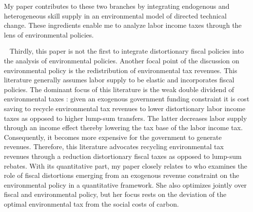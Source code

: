 My paper contributes to these two branches by integrating endogenous and heterogeneous skill supply in an environmental model of directed technical change. These ingredients enable me to analyze labor income taxes through the lens of environmental policies.  




\
Thirdly, this paper is not the first to integrate distortionary fiscal policies into the analysis of environmental policies.
Another focal point of the discussion on environmental policy is the redistribution of environmental tax revenues. This literature generally assumes labor supply to be elastic and incorporates fiscal policies. 
The dominant focus of this literature is the weak double dividend of environmental taxes \citep{Goulder1995EnvironmentalGuide, Bovenberg2002EnvironmentalRegulation}: given an exogenous government funding constraint it is cost saving to recycle environmental tax revenues to lower distortionary labor income taxes as opposed to higher lump-sum transfers. The latter decreases labor supply through an income effect thereby lowering the tax base of the labor income tax. Consequently, it becomes more expensive for the government to generate revenues.
Therefore, this literature advocates recycling environmental tax revenues through a reduction distortionary fiscal taxes as opposed to lump-sum rebates.
With its quantitative part, my paper closely relates to \cite{Barrage2019OptimalPolicy} who examines the role of fiscal distortions emerging from an exogenous revenue constraint on the environmental policy in a quantitative framework. She also optimizes jointly over fiscal and environmental policy, but her focus rests on the deviation of the optimal environmental tax from the social costs of carbon.

